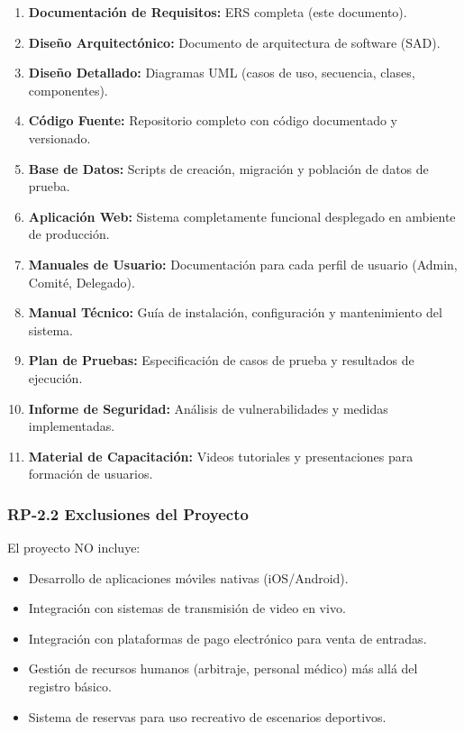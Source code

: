 \documentclass[12pt,a4paper]{article}
\begin{document}
\begin{enumerate}[noitemsep]
    \item \textbf{Documentación de Requisitos:} ERS completa (este documento).
    \item \textbf{Diseño Arquitectónico:} Documento de arquitectura de software (SAD).
    \item \textbf{Diseño Detallado:} Diagramas UML (casos de uso, secuencia, clases, componentes).
    \item \textbf{Código Fuente:} Repositorio completo con código documentado y versionado.
    \item \textbf{Base de Datos:} Scripts de creación, migración y población de datos de prueba.
    \item \textbf{Aplicación Web:} Sistema completamente funcional desplegado en ambiente de producción.
    \item \textbf{Manuales de Usuario:} Documentación para cada perfil de usuario (Admin, Comité, Delegado).
    \item \textbf{Manual Técnico:} Guía de instalación, configuración y mantenimiento del sistema.
    \item \textbf{Plan de Pruebas:} Especificación de casos de prueba y resultados de ejecución.
    \item \textbf{Informe de Seguridad:} Análisis de vulnerabilidades y medidas implementadas.
    \item \textbf{Material de Capacitación:} Videos tutoriales y presentaciones para formación de usuarios.
\end{enumerate}

\subsubsection{RP-2.2 Exclusiones del Proyecto}

El proyecto NO incluye:

\begin{itemize}[noitemsep]
    \item Desarrollo de aplicaciones móviles nativas (iOS/Android).
    \item Integración con sistemas de transmisión de video en vivo.
    \item Integración con plataformas de pago electrónico para venta de entradas.
    \item Gestión de recursos humanos (arbitraje, personal médico) más allá del registro básico.
    \item Sistema de reservas para uso recreativo de escenarios deportivos.
\end{itemize}
\end{document}
